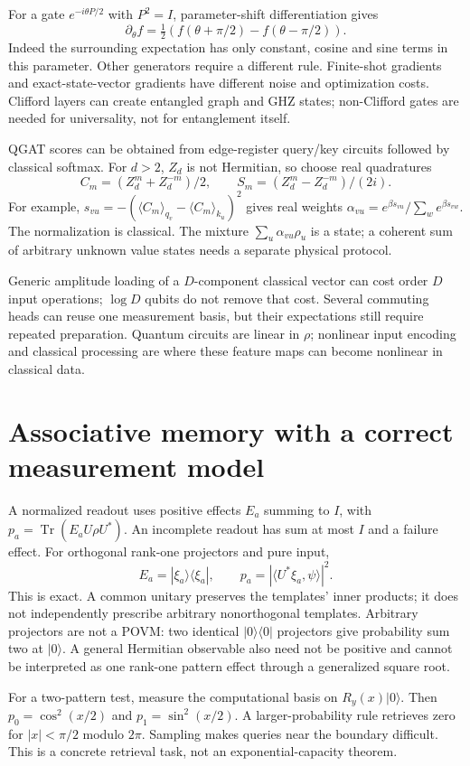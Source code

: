 \documentclass[11pt,oneside,openany]{book}
\theoremstyle{definition}\newtheorem{definition}[theorem]{Definition}
\theoremstyle{remark}\newtheorem{remark}[theorem]{Remark}
\begin{document}
For a gate $e^{-i\theta P/2}$ with $P^2=I$, parameter-shift differentiation
gives
\[
 \partial_\theta f=\tfrac12(f(\theta+\pi/2)-f(\theta-\pi/2)).
\]
Indeed the surrounding expectation has only constant, cosine and sine
terms in this parameter. Other generators require a different rule.
Finite-shot gradients and exact-state-vector gradients have different
noise and optimization costs. Clifford layers can create entangled graph
and GHZ states; non-Clifford gates are needed for universality, not for
entanglement itself.

QGAT scores can be obtained from edge-register query/key circuits followed
by classical softmax. For $d>2$, $Z_d$ is not Hermitian, so choose real
quadratures
\[
 C_m=(Z_d^m+Z_d^{-m})/2,\qquad S_m=(Z_d^m-Z_d^{-m})/(2i).
\]
For example,
$s_{vu}=-(\langle C_m\rangle_{q_v}-\langle C_m\rangle_{k_u})^2$ gives
real weights $\alpha_{vu}=e^{\beta s_{vu}}/\sum_we^{\beta s_{vw}}$.
The normalization is classical. The mixture $\sum_u\alpha_{vu}\rho_u$
is a state; a coherent sum of arbitrary unknown value states needs a
separate physical protocol.

Generic amplitude loading of a $D$-component classical vector can cost
order $D$ input operations; $\log D$ qubits do not remove that cost.
Several commuting heads can reuse one measurement basis, but their
expectations still require repeated preparation. Quantum circuits are
linear in $\rho$; nonlinear input encoding and classical processing are
where these feature maps can become nonlinear in classical data.

\section{Associative memory with a correct measurement model}
A normalized readout uses positive effects $E_a$ summing to $I$, with
$p_a=\operatorname{Tr}(E_aU\rho U^*)$. An incomplete readout has sum at
most $I$ and a failure effect. For orthogonal rank-one projectors and pure
input,
\[
 E_a=|\xi_a\rangle\langle\xi_a|,\qquad
 p_a=|\langle U^*\xi_a,\psi\rangle|^2.
\]
This is exact. A common unitary preserves the templates' inner products;
it does not independently prescribe arbitrary nonorthogonal templates.
Arbitrary projectors are not a POVM: two identical $|0\rangle\langle0|$
projectors give probability sum two at $|0\rangle$. A general Hermitian
observable also need not be positive and cannot be interpreted as one
rank-one pattern effect through a generalized square root.

For a two-pattern test, measure the computational basis on $R_y(x)|0\rangle$.
Then $p_0=\cos^2(x/2)$ and $p_1=\sin^2(x/2)$. A larger-probability rule
retrieves zero for $|x|<\pi/2$ modulo $2\pi$. Sampling makes queries near
the boundary difficult. This is a concrete retrieval task, not an
exponential-capacity theorem.
\end{document}
